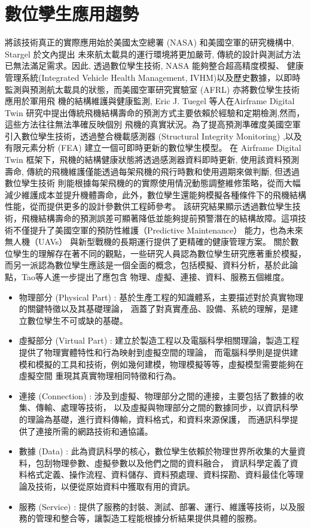\section{數位孿生應用趨勢}
將該技術真正的實際應用始於美國太空總署 (NASA) 和美國空軍的研究機構中, Stargel \cite{Glaessgen2012DigitalTwin}於文內提出
未來航太載具的運行環境將更加嚴苛, 傳統的設計與測試方法已無法滿足需求。因此, 透過數位孿生技術, NASA 能夠整合超高精度模擬、
健康管理系統(Integrated Vehicle Health Management, IVHM)以及歷史數據，以即時監測與預測航太載具的狀態，而美國空軍研究實驗室 (AFRL) 亦將數位孿生技術應用於軍用飛
機的結構維護與健康監測, Eric J. Tuegel \cite{Tuegel2011DigitalTwin}等人在Airframe Digital Twin 研究中提出傳統飛機結構壽命的預測方式主要依賴於經驗和定期檢測,然而，這些方法往往無法準確反映個別
飛機的真實狀況。為了提高預測準確度美國空軍引入數位孿生技術，透過整合機載感測器 (Structural Integrity Monitoring) ,以及有限元素分析 (FEA) 建立一個可即時更新的數位孿生模型。
在 Airframe Digital Twin 框架下，飛機的結構健康狀態將透過感測器資料即時更新, 使用該資料預測壽命, 傳統的飛機維護僅能透過每架飛機的飛行時數和使用週期來做判斷, 但透過數位孿生技術
則能根據每架飛機的的實際使用情況動態調整維修策略，從而大幅減少維護成本並提升機體壽命，此外，數位孿生還能夠模擬各種條件下的飛機結構性能，從而提供更多的設計參數供工程師參考。
該研究結果顯示透過數位孿生技術，飛機結構壽命的預測誤差可顯著降低並能夠提前預警潛在的結構故障。這項技術不僅提升了美國空軍的預防性維護（Predictive Maintenance） 能力，也為未來無人機（UAVs）
與新型戰機的長期運行提供了更精確的健康管理方案。
關於數位孿生的理解存在著不同的觀點，一些研究人員認為數位孿生研究應著重於模擬，而另一派認為數位孿生應該是一個全面的概念，包括模擬、資料分析，基於此論點，Tao等人\cite{Tao2019DigitalTwin}進一步提出了應包含
物理、虛擬、連接、資料、服務五個維度。
\begin{itemize}
      \item 物理部分 (Physical Part) :
            基於生產工程的知識體系，主要描述對於真實物理的關鍵特徵以及其基礎理論，
            涵蓋了對真實產品、設備、系統的理解，是建立數位孿生不可或缺的基礎。
      \item 虛擬部分 (Virtual Part) :
            建立於製造工程以及電腦科學相關理論，製造工程提供了物理實體特性和行為映射到虛擬空間的理論，
            而電腦科學則是提供建模和模擬的工具和技術，例如幾何建模，物理模擬等等，虛擬模型需要能夠在虛擬空間
            重現其真實物理相同特徵和行為。
      \item 連接 (Connection) :
            涉及到虛擬、物理部分之間的連接，主要包括了數據的收集、傳輸、處理等技術，
            以及虛擬與物理部分之間的數據同步，以資訊科學的理論為基礎，進行資料傳輸，資料格式，和資料來源保護，
            而通訊科學提供了連接所需的網路技術和通協議。
      \item 數據 (Data) :
            此為資訊科學的核心，數位孿生依賴於物理世界所收集的大量資料，包刮物理參數、虛擬參數以及他們之間的資料融合，
            資訊科學定義了資料格式定義、操作流程、資料儲存、資料預處理、資料探勘、資料最佳化等理論及技術，以便從原始資料中獲取有用的資訊。
      \item 服務 (Service) :
            提供了服務的封裝、測試、部署、運行、維護等技術，以及服務的管理和整合等，讓製造工程能根據分析結果提供具體的服務。
\end{itemize}
